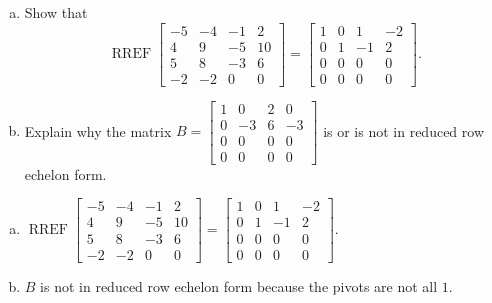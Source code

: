 
\begin{exerciseStatement}

\begin{enumerate}[(a)]
\item Show that \[\operatorname{RREF} \left[\begin{array}{cccc}
-5 & -4 & -1 & 2 \\
4 & 9 & -5 & 10 \\
5 & 8 & -3 & 6 \\
-2 & -2 & 0 & 0
\end{array}\right] = \left[\begin{array}{cccc}
1 & 0 & 1 & -2 \\
0 & 1 & -1 & 2 \\
0 & 0 & 0 & 0 \\
0 & 0 & 0 & 0
\end{array}\right] .\]
\item Explain why the matrix \(B= \left[\begin{array}{cccc}
1 & 0 & 2 & 0 \\
0 & -3 & 6 & -3 \\
0 & 0 & 0 & 0 \\
0 & 0 & 0 & 0
\end{array}\right] \) is or is not in reduced row echelon form.
\end{enumerate}
    
\end{exerciseStatement}
    
\begin{exerciseAnswer} 

\begin{enumerate}[(a)]
\item \(\operatorname{RREF} \left[\begin{array}{cccc}
-5 & -4 & -1 & 2 \\
4 & 9 & -5 & 10 \\
5 & 8 & -3 & 6 \\
-2 & -2 & 0 & 0
\end{array}\right] = \left[\begin{array}{cccc}
1 & 0 & 1 & -2 \\
0 & 1 & -1 & 2 \\
0 & 0 & 0 & 0 \\
0 & 0 & 0 & 0
\end{array}\right] .\)
\item \(B\) is not in reduced row echelon form because the pivots are not all \(1\). 
\end{enumerate}
    
\end{exerciseAnswer}
    
